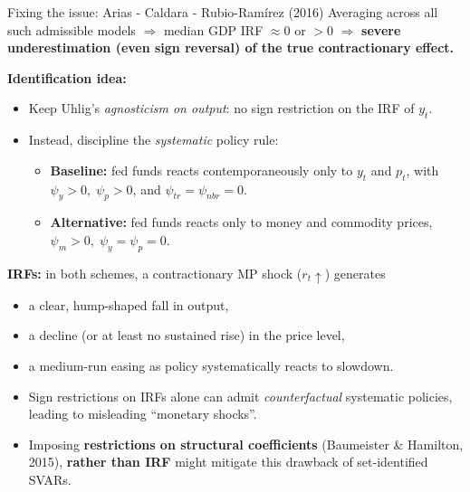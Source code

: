 \documentclass{beamer}
\begin{document}
\begin{frame}{Fixing the issue: Arias - Caldara - Rubio-Ramírez (2016)}
\footnotesize
Averaging across all such admissible models $\Rightarrow$ median GDP IRF $\approx 0$ or $>0$
        $\Rightarrow$ \textbf{severe underestimation (even sign reversal) of the true contractionary effect.}

        \medskip
        
\textbf{Identification idea:}
\begin{itemize}
  \item Keep Uhlig's \emph{agnosticism on output}: no sign restriction on the IRF of $y_t$.
  \item Instead, discipline the \emph{systematic} policy rule:
    \begin{itemize}
    \footnotesize
      \item \textbf{Baseline:} fed funds reacts contemporaneously only to $y_t$ and $p_t$,
            with $\psi_y > 0,\; \psi_p > 0$, and $\psi_{tr} = \psi_{nbr} = 0$.
      \item \textbf{Alternative:} fed funds reacts only to money and commodity prices,
            $\psi_m > 0,\; \psi_y = \psi_p = 0$.
    \end{itemize}
\end{itemize}

\medskip
\textbf{IRFs:} in both schemes, a contractionary MP shock ($r_t\uparrow$) generates
\begin{itemize}
    \begin{itemize}
    \footnotesize
      \item a clear, hump-shaped fall in output,
      \item a decline (or at least no sustained rise) in the price level,
      \item a medium-run easing as policy systematically reacts to slowdown.
    \end{itemize}
\end{itemize}

\begin{itemize}
  \item Sign restrictions on IRFs alone can admit \emph{counterfactual} systematic policies,
        leading to misleading “monetary shocks”.
  \item Imposing\textbf{ restrictions on structural coefficients }(Baumeister \& Hamilton, 2015), \textbf{rather than IRF} might mitigate this drawback of set-identified SVARs. 
\end{itemize}

\end{frame}
\end{document}
